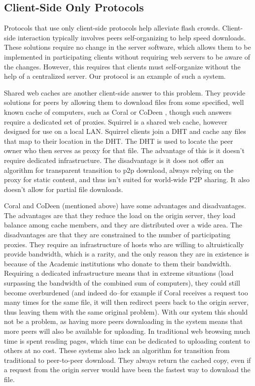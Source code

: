 {\subsection{Client-Side Only Protocols}
Protocols that use only client-side protocols help alleviate flash crowds.  Client-side interaction typically involves peers self-organizing to help speed downloads.  These solutions require no change in the server software, which allows them to be implemented in participating clients without requiring web servers to be aware of the changes.  However, this requires that clients must self-organize without the help of a centralized server.  Our protocol is an example of such a system.

Shared web caches are another client-side answer to this problem.  They provide solutions for peers by allowing them to download files from some specified, well known cache of computers, such as Coral \cite{coral} or CoDeen \cite{codeen}, though such answers require a dedicated set of proxies.  Squirrel \cite{squirrel} is a shared web cache, however designed for use on a local LAN.  Squirrel clients join a DHT and cache any files that map to their location in the DHT.  The DHT is used to locate the peer owner who then serves as proxy for that file.  The advantage of this is it doesn't require dedicated infrastructure.  The disadvantage is it does not offer an algorithm for transparent transition to p2p download, always relying on the proxy for static content, and thus isn't suited for world-wide P2P sharing.  It also doesn't allow for partial file downloads.

Coral and CoDeen (mentioned above) have some advantages and disadvantages.  The advantages are that they reduce the load on the origin server, they load balance among cache members, and they are distributed over a wide area.  The disadvantages are that they are constrained to the number of participating proxies. They require an infrastructure of hosts who are willing to altruistically provide bandwidth, which is a rarity, and the only reason they are in existence is because of the Academic institutions who donate to them their bandwidth.  Requiring a dedicated infrastructure means that in extreme situations (load surpassing the bandwidth of the combined sum of computers), they could still become overburdened (and indeed do--for example if Coral receives a request too many times for the same file, it will then redirect peers back to the origin server, thus leaving them with the same original problem).  With our system this should not be a problem, as having more peers downloading in the system means that more peers will also be available for uploading.  In traditional web browsing much time is spent reading pages, which time can be dedicated to uploading content to others at no cost.  These systems also lack an algorithm for transition from traditional to peer-to-peer download.  They always return the cached copy, even if a request from the origin server would have been the fastest way to download the file.    

}
